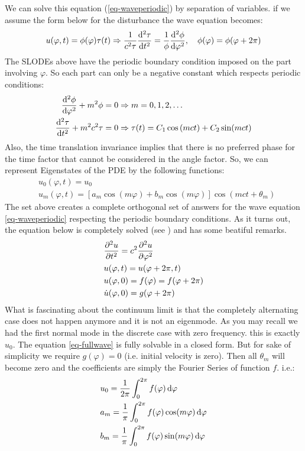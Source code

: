 \documentclass[final,5p,times,twocolumn,authoryear]{elsarticle}
\begin{document}
We can solve this equation (\ref{eq-waveperiodic}) by separation of variables. if we assume the form below for the disturbance the wave equation becomes:
\[ u(\varphi,t) = \phi(\varphi)\tau(t) \Rightarrow \frac{1}{c^2\tau}\odv[order={2}]{\tau}{t} = \frac{1}{\phi}\odv[order={2}]{\phi}{\varphi}, \quad \phi(\varphi) = \phi(\varphi+2\pi) \]
The SLODEs above have the periodic boundary condition imposed on the part involving $\varphi$. So each part can only be a negative constant which respects periodic conditions:
\begin{align}
	\odv[order={2}]{\phi}{\varphi} + m^2 \phi =0 &\Rightarrow m = 0 , 1 , 2 , \dots \label{eq-restrictions} \\
	\odv[order={2}]{\tau}{t} + m^2c^2 \tau =0 &\Rightarrow \tau(t) = C_1 \cos\left(mct\right) + C_2 \sin(mct) \label{eq-timepart}
\end{align}
Also, the time translation invariance implies that there is no preferred phase for the time factor that cannot be considered in the angle factor. So, we can represent Eigenstates of the PDE by the following functions:
\begin{align*}
	& u_0(\varphi,t) = u_0 \\
	& u_m(\varphi,t) = \left[a_m \cos(m\varphi) + b_m\cos(m\varphi)\right]\cos(mct+\theta_m)
\end{align*}
The set above creates a complete orthogonal set of answers for the wave equation \ref{eq-waveperiodic} respecting the periodic boundary conditions. As it turns out, the equation below is completely solved (see \cite{evansPartialDifferentialEquations2022}) and has some beatiful remarks.
\begin{equation}
	\label{eq-fullwave}\begin{aligned}
		& \pdv[order={2}]{u}{t} = c^2 \pdv[order={2}]{u}{\varphi} \\
		& u(\varphi,t) = u(\varphi+2\pi,t) \\
		& u(\varphi,0) = f(\varphi) = f(\varphi + 2\pi) \\
		& \dot{u}(\varphi,0) = g(\varphi + 2\pi)
	\end{aligned}
\end{equation}
What is fascinating about the continuum limit is that the completely alternating case does not happen anymore and it is not an eigenmode. As you may recall we had the first normal mode in the discrete case with zero frequency. this is exactly $u_0$. The equation \ref{eq-fullwave} is fully solvable in a closed form. But for sake of simplicity we require $g(\varphi) = 0$ (i.e. initial velocity is zero). Then all $\theta_m$ will become zero and the coefficients are simply the Fourier Series of function $f$. i.e.:
\begin{equation}
	\begin{aligned}
		&u_0 = \frac{1}{2\pi}\int_{0}^{2\pi}f(\varphi)\odif{\varphi} \\
		&a_m = \frac{1}{\pi}\int_{0}^{2\pi}f(\varphi)\cos(m\varphi)\odif{\varphi} \\
		&b_m = \frac{1}{\pi}\int_{0}^{2\pi}f(\varphi)\sin(m\varphi)\odif{\varphi}
	\end{aligned}
\end{equation}
\end{document}
